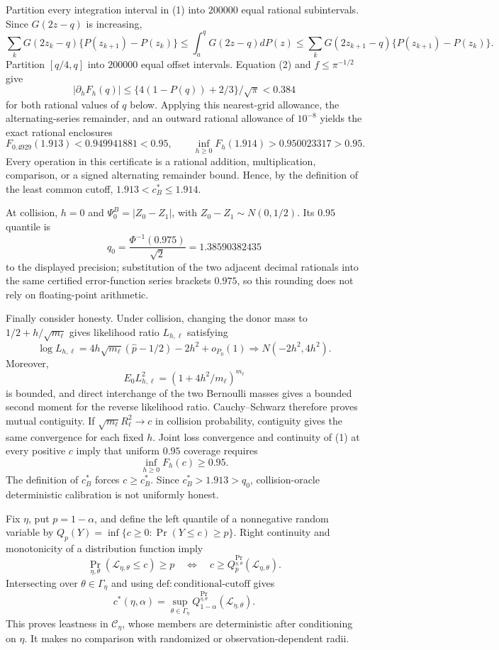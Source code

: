 Partition every integration interval in (1) into \(200000\) equal rational subintervals.  Since \(G(2z-q)\) is increasing,
\[
 \sum_kG(2z_k-q)\{P(z_{k+1})-P(z_k)\}
 \leq\int_a^qG(2z-q)dP(z)
 \leq\sum_kG(2z_{k+1}-q)\{P(z_{k+1})-P(z_k)\}.
\]
Partition \([q/4,q]\) into \(200000\) equal offset intervals.  Equation (2) and \(f\leq\pi^{-1/2}\) give
\[
 |\partial_hF_h(q)|
 \leq\{4(1-P(q))+2/3\}/\sqrt\pi<0.384
\]
for both rational values of \(q\) below.  Applying this nearest-grid allowance, the alternating-series remainder, and an outward rational allowance of \(10^{-8}\) yields the exact rational enclosures
\[
 F_{0.4929}(1.913)<0.949941881<0.95,
 \qquad
 \inf_{h\geq0}F_h(1.914)>0.950023317>0.95.
\]
Every operation in this certificate is a rational addition, multiplication, comparison, or a signed alternating remainder bound.  Hence, by the definition of the least common cutoff,
\(1.913<c_B^*\leq1.914\).

At collision, \(h=0\) and \(\Psi^B_0=|Z_0-Z_1|\), with
\(Z_0-Z_1\sim N(0,1/2)\).  Its \(0.95\) quantile is
\[
 q_0=\frac{\Phi^{-1}(0.975)}{\sqrt2}
 =1.38590382435
\]
to the displayed precision; substitution of the two adjacent decimal rationals into the same certified error-function series brackets \(0.975\), so this rounding does not rely on floating-point arithmetic.

Finally consider honesty.  Under collision, changing the donor mass to
\(1/2+h/\sqrt{m_\ell}\) gives likelihood ratio \(L_{h,\ell}\) satisfying
\[
 \log L_{h,\ell}
 =4h\sqrt{m_\ell}(\widehat p-1/2)-2h^2+o_{P_0}(1)
 \Rightarrow N(-2h^2,4h^2).
\]
Moreover,
\[
 E_0L_{h,\ell}^2=(1+4h^2/m_\ell)^{m_\ell}
\]
is bounded, and direct interchange of the two Bernoulli masses gives a bounded second moment for the reverse likelihood ratio.  Cauchy--Schwarz therefore proves mutual contiguity.  If
\(\sqrt{m_\ell}R_\ell^2\to c\) in collision probability, contiguity gives the same convergence for each fixed \(h\).  Joint loss convergence and continuity of (1) at every positive \(c\) imply that uniform \(0.95\) coverage requires
\[
 \inf_{h\geq0}F_h(c)\geq0.95.
\]
The definition of \(c_B^*\) forces \(c\geq c_B^*\).  Since
\(c_B^*>1.913>q_0\), collision-oracle deterministic calibration is not uniformly honest.

Fix \(\eta\), put \(p=1-\alpha\), and define the left quantile of a nonnegative random variable by
\(Q_p(Y)=\inf\{c\geq0:\Pr(Y\leq c)\geq p\}\).  Right continuity and monotonicity of a distribution function imply
\[
 \Pr_{\eta,\theta}(\mathcal L_{\eta,\theta}\leq c)\geq p
 \quad\Longleftrightarrow\quad
 c\geq Q_p^{\Pr_{\eta,\theta}}(\mathcal L_{\eta,\theta}).
\]
Intersecting over \(\theta\in\Gamma_\eta\) and using
\(\mathrm{def:conditional\mbox{-}cutoff}\) gives
\[
 c^*(\eta,\alpha)=\sup_{\theta\in\Gamma_\eta}
 Q_{1-\alpha}^{\Pr_{\eta,\theta}}(\mathcal L_{\eta,\theta}).
\]
This proves leastness in \(\mathscr C_\eta\), whose members are deterministic after conditioning on \(\eta\).  It makes no comparison with randomized or observation-dependent radii.

